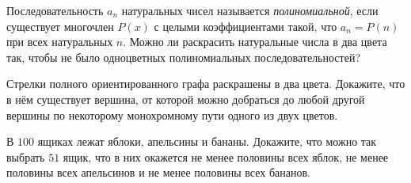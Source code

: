 \resetproblem \begingroup %
    \def\jeolmdate{8 июня 2018 г., пара 1}%
    \def\jeolmgroupname{Группа 9-1}%
    \def\jeolmauthors{Кушнир А., Тихонов~Ю.}%
\jeolmheader \endgroup


\begin{problems}

\item Последовательность $a_n$ натуральных чисел называется \emph{полиномиальной}, если существует многочлен $P(x)$ с целыми коэффициентами такой, что $a_n = P(n)$ при всех натуральных $n$. Можно ли раскрасить натуральные числа в два цвета так, чтобы не было одноцветных полиномиальных последовательностей?

\item Стрелки полного ориентированного графа раскрашены в два цвета. Докажите, что в нём существует вершина, от которой можно добраться до любой другой вершины по некоторому монохромному пути одного из двух цветов.

\item В $100$ ящиках лежат яблоки, апельсины и бананы. Докажите, что можно так выбрать $51$ ящик, что в них окажется не менее половины всех яблок, не менее половины всех апельсинов и не менее половины всех бананов.

\end{problems}
